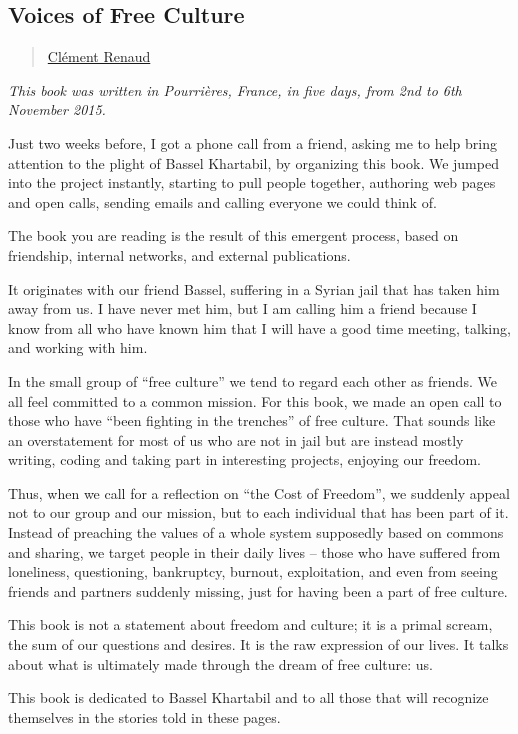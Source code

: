 \subsection{Voices of Free Culture}\label{voices-of-free-culture}

\begin{quote}
\hyperlink{clement-renaud}{Clément Renaud}
\end{quote}

\emph{This book was written in Pourrières, France, in five days, from
2nd to 6th November 2015.}

Just two weeks before, I got a phone call from a friend, asking me to
help bring attention to the plight of Bassel Khartabil, by organizing
this book. We jumped into the project instantly, starting to pull people
together, authoring web pages and open calls, sending emails and calling
everyone we could think of.

The book you are reading is the result of this emergent process, based
on friendship, internal networks, and external publications.

It originates with our friend Bassel, suffering in a Syrian jail that
has taken him away from us. I have never met him, but I am calling him a
friend because I know from all who have known him that I will have a
good time meeting, talking, and working with him.

In the small group of ``free culture'' we tend to regard each other as
friends. We all feel committed to a common mission. For this book, we
made an open call to those who have ``been fighting in the trenches'' of
free culture. That sounds like an overstatement for most of us who are
not in jail but are instead mostly writing, coding and taking part in
interesting projects, enjoying our freedom.

Thus, when we call for a reflection on ``the Cost of Freedom'', we
suddenly appeal not to our group and our mission, but to each individual
that has been part of it. Instead of preaching the values of a whole
system supposedly based on commons and sharing, we target people in
their daily lives -- those who have suffered from loneliness,
questioning, bankruptcy, burnout, exploitation, and even from seeing
friends and partners suddenly missing, just for having been a part of
free culture.

This book is not a statement about freedom and culture; it is a primal
scream, the sum of our questions and desires. It is the raw expression
of our lives. It talks about what is ultimately made through the dream
of free culture: us.

This book is dedicated to Bassel Khartabil and to all those that will
recognize themselves in the stories told in these pages.

